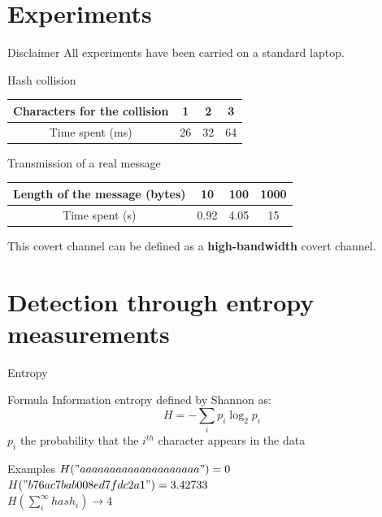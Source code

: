 \documentclass[11pt, compress]{beamer}
\begin{document}
\section{Experiments}

\begin{frame}{Disclaimer}
\vfill
All experiments have been carried on a standard laptop.
\vfill
\end{frame}

\begin{frame}{Hash collision}
\vfill
\begin{center}
    \begin{tabular}{ | c | c | c | c |}
    \hline
    Characters for the collision & 1  & 2 & 3 \\ \hline
    Time spent (ms) & 26 & 32 & 64  \\ \hline
    \end{tabular}
\end{center}
\vfill
\end{frame}

\begin{frame}{Transmission of a real message}
\vfill
\begin{center}
    \begin{tabular}{ | c | c | c | c | }
    \hline
    Length of the message (bytes) & 10  & 100  & 1000  \\ \hline
    Time spent (s) &  0.92  & 4.05  & 15  \\ \hline
    \end{tabular}
\end{center}
\vfill
This covert channel can be defined as a \textbf{high-bandwidth} covert channel.
\vfill
\end{frame}

\section{Detection through entropy measurements}

\begin{frame}{Entropy}
    \vfill
    \begin{block}{Formula}
        Information entropy defined by Shannon as:\\
        \begin{equation}
        H = - \sum_{i} p_i \log_2{p_i}
        \end{equation}
        $p_i$ the probability that the $i^{th}$ character appears in the data
    \end{block}
    \vfill
    \begin{block}{Examples}
        $H("aaaaaaaaaaaaaaaaaaaa") = 0$\\
        $H("b76ac7bab008ed7fdc2a1") = 3.42733$\\
        $H(\sum_i^{\infty} hash_i) \rightarrow 4$
    \end{block}
    \vfill
\end{frame}
\end{document}
